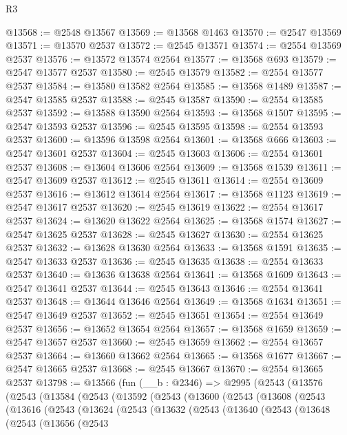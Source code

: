 \begin{lexlean}{R3}
\begin{coremodule}
@13568 := @2548 @13567
@13569 := @13568 @1463
@13570 := @2547 @13569
@13571 := @13570 @2537
@13572 := @2545 @13571
@13574 := @2554 @13569 @2537
@13576 := @13572 @13574 @2564
@13577 := @13568 @693
@13579 := @2547 @13577 @2537
@13580 := @2545 @13579
@13582 := @2554 @13577 @2537
@13584 := @13580 @13582 @2564
@13585 := @13568 @1489
@13587 := @2547 @13585 @2537
@13588 := @2545 @13587
@13590 := @2554 @13585 @2537
@13592 := @13588 @13590 @2564
@13593 := @13568 @1507
@13595 := @2547 @13593 @2537
@13596 := @2545 @13595
@13598 := @2554 @13593 @2537
@13600 := @13596 @13598 @2564
@13601 := @13568 @666
@13603 := @2547 @13601 @2537
@13604 := @2545 @13603
@13606 := @2554 @13601 @2537
@13608 := @13604 @13606 @2564
@13609 := @13568 @1539
@13611 := @2547 @13609 @2537
@13612 := @2545 @13611
@13614 := @2554 @13609 @2537
@13616 := @13612 @13614 @2564
@13617 := @13568 @1123
@13619 := @2547 @13617 @2537
@13620 := @2545 @13619
@13622 := @2554 @13617 @2537
@13624 := @13620 @13622 @2564
@13625 := @13568 @1574
@13627 := @2547 @13625 @2537
@13628 := @2545 @13627
@13630 := @2554 @13625 @2537
@13632 := @13628 @13630 @2564
@13633 := @13568 @1591
@13635 := @2547 @13633 @2537
@13636 := @2545 @13635
@13638 := @2554 @13633 @2537
@13640 := @13636 @13638 @2564
@13641 := @13568 @1609
@13643 := @2547 @13641 @2537
@13644 := @2545 @13643
@13646 := @2554 @13641 @2537
@13648 := @13644 @13646 @2564
@13649 := @13568 @1634
@13651 := @2547 @13649 @2537
@13652 := @2545 @13651
@13654 := @2554 @13649 @2537
@13656 := @13652 @13654 @2564
@13657 := @13568 @1659
@13659 := @2547 @13657 @2537
@13660 := @2545 @13659
@13662 := @2554 @13657 @2537
@13664 := @13660 @13662 @2564
@13665 := @13568 @1677
@13667 := @2547 @13665 @2537
@13668 := @2545 @13667
@13670 := @2554 @13665 @2537
@13798 := @13566
    (fun (__b : @2346) =>
    @2995
      (@2543
        (@13576
          (@2543
            (@13584
              (@2543
                (@13592
                  (@2543
                    (@13600
                      (@2543
                        (@13608
                          (@2543
                            (@13616
                              (@2543
                                (@13624
                                  (@2543
                                    (@13632
                                      (@2543
                                        (@13640
                                          (@2543
                                            (@13648
                                              (@2543
                                                (@13656
                                                  (@2543

\end{coremodule}
\end{lexlean}
